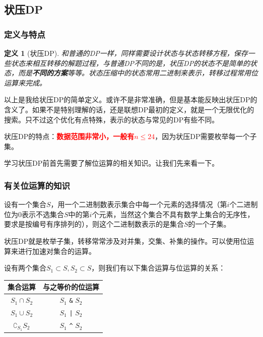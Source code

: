 \documentclass{article}
\newtheorem{definition}{定义}[subsection]
\theoremstyle{nonumberplain}
\begin{document}
\subsection{状压DP}
\subsubsection{定义与特点}
\begin{definition}[状压DP]和普通的DP一样，同样需要设计状态与状态转移方程，保存一些状态来相互转移的解题过程，与普通DP不同的是，状压DP的状态不是简单的状态，而是\textbf{不同的方案}等等。状态压缩中的状态常用二进制来表示，转移过程常用位运算来完成。
\end{definition}

以上是我给状压DP的简单定义。或许不是非常准确，但是基本能反映出状压DP的含义了。如果不是特别理解的话，还是联想DP最初的定义，就是一个无限优化的搜索。只不过这个优化有点特殊，表示的状态与常见的DP有些不同。

状压DP的特点：\textcolor{red}{\textbf{数据范围非常小，一般有$n\leq 24$}}，因为状压DP需要枚举每一个子集。

学习状压DP前首先需要了解位运算的相关知识。让我们先来看一下。
\subsubsection{有关位运算的知识}
设有一个集合$S$，用一个二进制数表示集合中每一个元素的选择情况（第$i$个二进制位为0表示不选集合$S$中的第$i$个元素，当然这个集合不具有数学上集合的无序性，要求是按编号有序排列的），则这个二进制数表示的是集合$S$的一个子集。

状压DP就是枚举子集，转移常常涉及对并集，交集、补集的操作。可以使用位运算来进行加速对集合的运算。

设有两个集合$S_1\subset S, S_2\subset S$，则我们有以下集合运算与位运算的关系：

\begin{center}
	\begin{tabular}{|c|c|}
		\hline
		集合运算               & 与之等价的位运算                   \\
		\hline
		$S_1\cap S_2$          & $S_1$ \verb+&+ $S_2$ \\
		\hline
		$S_1\cup S_2$          & $S_1$ \verb+|+ $S_2$ \\
		\hline
		$\complement_{S_1}S_2$ & $S_1$ \verb+^+ $S_2$ \\
		\hline
	\end{tabular}
\end{center}
\end{document}
